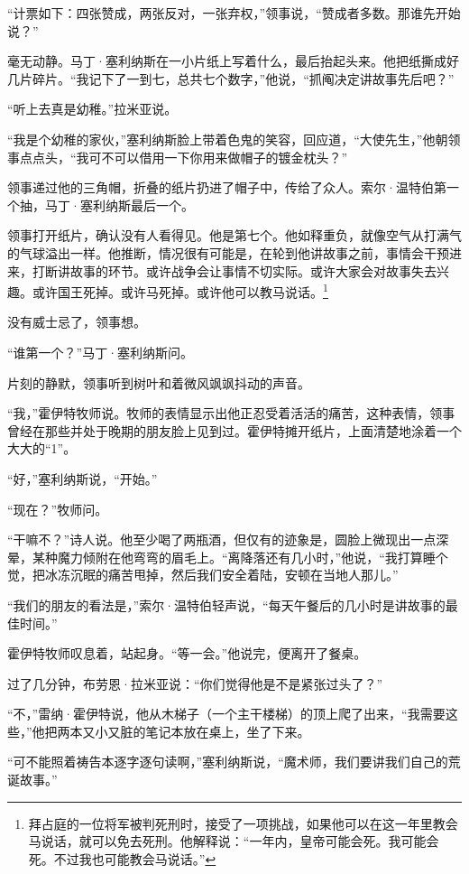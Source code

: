 \documentclass[AutoFakeBold=true]{book}
\begin{document}
``计票如下：四张赞成，两张反对，一张弃权，''领事说，``赞成者多数。那谁先开始说？''

毫无动静。马丁·塞利纳斯在一小片纸上写着什么，最后抬起头来。他把纸撕成好几片碎片。``我记下了一到七，总共七个数字，''他说，``抓阄决定讲故事先后吧？''

``听上去真是幼稚。''拉米亚说。

``我是个幼稚的家伙，''塞利纳斯脸上带着色鬼的笑容，回应道，``大使先生，''他朝领事点点头，``我可不可以借用一下你用来做帽子的镀金枕头？''

领事递过他的三角帽，折叠的纸片扔进了帽子中，传给了众人。索尔·温特伯第一个抽，马丁·塞利纳斯最后一个。

领事打开纸片，确认没有人看得见。他是第七个。他如释重负，就像空气从打满气的气球溢出一样。他推断，情况很有可能是，在轮到他讲故事之前，事情会干预进来，打断讲故事的环节。或许战争会让事情不切实际。或许大家会对故事失去兴趣。或许国王死掉。或许马死掉。或许他可以教马说话。\footnote{拜占庭的一位将军被判死刑时，接受了一项挑战，如果他可以在这一年里教会马说话，就可以免去死刑。他解释说：``一年内，皇帝可能会死。我可能会死。不过我也可能教会马说话。''}

{\kaishu 没有威士忌了}，领事想。

``谁第一个？''马丁·塞利纳斯问。

片刻的静默，领事听到树叶和着微风飒飒抖动的声音。

``我，''霍伊特牧师说。牧师的表情显示出他正忍受着活活的痛苦，这种表情，领事曾经在那些并处于晚期的朋友脸上见到过。霍伊特摊开纸片，上面清楚地涂着一个大大的``1''。

``好，''塞利纳斯说，``开始。''

``现在？''牧师问。

``干嘛不？''诗人说。他至少喝了两瓶酒，但仅有的迹象是，圆脸上微现出一点深晕，某种魔力倾附在他弯弯的眉毛上。``离降落还有几小时，''他说，``我打算睡个觉，把冰冻沉眠的痛苦甩掉，然后我们安全着陆，安顿在当地人那儿。''

``我们的朋友的看法是，''索尔·温特伯轻声说，``每天午餐后的几小时是讲故事的最佳时间。''

霍伊特牧师叹息着，站起身。``等一会。''他说完，便离开了餐桌。

过了几分钟，布劳恩·拉米亚说：``你们觉得他是不是紧张过头了？''

``不，''雷纳·霍伊特说，他从木梯子（一个主干楼梯）的顶上爬了出来，``我需要这些，''他把两本又小又脏的笔记本放在桌上，坐了下来。

``可不能照着祷告本逐字逐句读啊，''塞利纳斯说，``魔术师，我们要讲我们自己的荒诞故事。''
\end{document}
